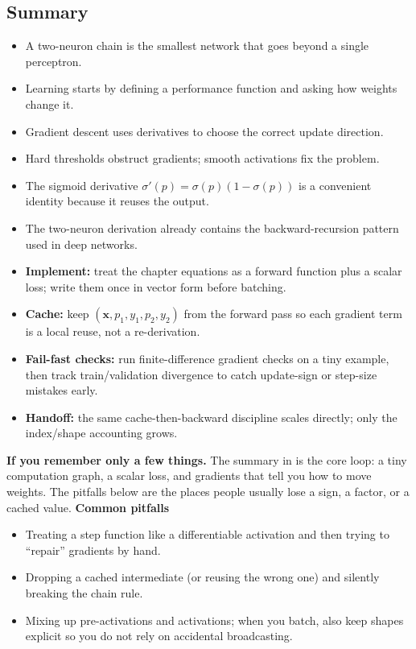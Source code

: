 \subsection{Summary}
\label{sec:mlp_summary}
\begin{itemize}
    \item A two\hyp{}neuron chain is the smallest network that goes beyond a single perceptron.
    \item Learning starts by defining a performance function and asking how weights change it.
    \item Gradient descent uses derivatives to choose the correct update direction.
    \item Hard thresholds obstruct gradients; smooth activations fix the problem.
    \item The sigmoid derivative $\sigma'(p)=\sigma(p)(1-\sigma(p))$ is a convenient identity because it reuses the output.
    \item The two\hyp{}neuron derivation already contains the backward-recursion pattern used in deep networks.
\end{itemize}

\begin{tcolorbox}[summarybox, title={Derivation closure: implement, cache, fail-fast}]
\begin{itemize}
    \item \textbf{Implement:} treat the chapter equations as a forward function plus a scalar loss; write them once in vector form before batching.
    \item \textbf{Cache:} keep \((\mathbf{x}, p_1, y_1, p_2, y_2)\) from the forward pass so each gradient term is a local reuse, not a re-derivation.
    \item \textbf{Fail-fast checks:} run finite-difference gradient checks on a tiny example, then track train/validation divergence to catch update-sign or step-size mistakes early.
    \item \textbf{Handoff:} the same cache-then-backward discipline scales directly; only the index/shape accounting grows.
\end{itemize}
\end{tcolorbox}

\begin{tcolorbox}[summarybox, title={Key takeaways}]
\textbf{If you remember only a few things.} The summary in  is the core loop: a tiny computation graph, a scalar loss, and gradients that tell you how to move weights. The pitfalls below are the places people usually lose a sign, a factor, or a cached value.
\medskip
\textbf{Common pitfalls}
\begin{itemize}
    \item Treating a step function like a differentiable activation and then trying to ``repair'' gradients by hand.
    \item Dropping a cached intermediate (or reusing the wrong one) and silently breaking the chain rule.
    \item Mixing up pre\hyp{}activations and activations; when you batch, also keep shapes explicit so you do not rely on accidental broadcasting.
\end{itemize}
\end{tcolorbox}

